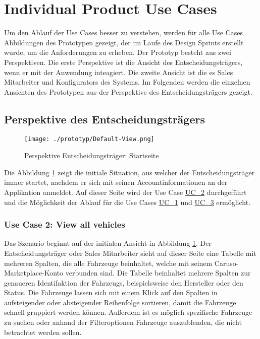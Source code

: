 \section{Individual Product Use Cases}
Um den Ablauf der Use Cases besser zu verstehen, werden für alle Use Cases Abbildungen des Prototypen gezeigt, der im Laufe des Design Sprints erstellt wurde, um die Anforderungen zu erheben. Der Prototyp besteht aus zwei Perspektiven. Die erste Perspektive ist die Ansicht des Entscheidungsträgers, wenn er mit der Anwendung inteagiert. Die zweite Ansicht ist die es Sales Mitarbeiter und Konfigurators des Systems. Im Folgenden werden die einzelnen Ansichten des Prototypen aus der Perspektive des Entscheidungsträgers gezeigt.


\subsection{Perspektive des Entscheidungsträgers}
\begin{figure}[H]
  \centering
  \texttt{[image: ./prototyp/Default-View.png]}
  \caption{Perspektive Entscheidungsträger: Startseite}
  \label{DecisionMaker:Homepage}
\end{figure}

Die Abbildung \ref{DecisionMaker:Homepage} zeigt die initiale Situation, aus welcher der Entscheidungsträger immer startet, nachdem er sich mit seinen Accountinformationen an der Applikation anmeldet. Auf dieser Seite wird der Use Case \hyperlink{Ref:UC2}{UC\_2} durchgeführt und die Möglichkeit der Ablauf für die Use Cases \hyperlink{Ref:UC1}{UC\_1} und \hyperlink{Ref:UC3}{UC\_3} ermöglicht. 


\subsubsection{Use Case 2: View all vehicles}
Das Szenario beginnt auf der initialen Ansicht in Abbildung \ref{DecisionMaker:Homepage}. Der Entscheidungsträger oder Sales Mitarbeiter sieht auf dieser Seite eine Tabelle mit mehreren Spalten, die alle Fahrzeuge beinhaltet, welche mit seinem Caruso-Marketplace-Konto verbunden sind. Die Tabelle beinhaltet mehrere Spalten zur genaueren Identifaktion der Fahrzeugs, beispielsweise den Hersteller oder den Status. Die Fahrzeuge lassen sich mit einem Klick auf den Spalten in aufsteigender oder absteigender Reihenfolge sortieren, damit die Fahrzeuge schnell gruppiert werden können. Außerdem ist es möglich spezifische Fahrzeuge zu suchen oder anhand der Filteroptionen Fahrzeuge auszublenden, die nicht betrachtet werden sollen.

